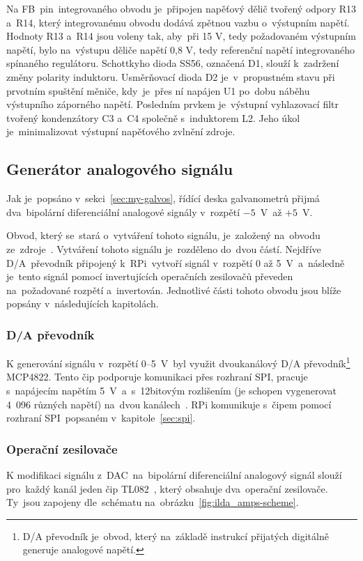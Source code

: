Na FB~pin~integrovaného obvodu je~připojen napěťový dělič tvořený odpory R13 a~R14, který integrovanému obvodu dodává zpětnou vazbu o~výstupním napětí.
Hodnoty R13 a~R14 jsou voleny tak, aby~při 15 V, tedy požadovaném výstupním napětí, bylo na~výstupu děliče napětí 0,8 V, tedy referenční napětí integrovaného spínaného regulátoru.
Schottkyho dioda SS56, označená D1, slouží k~zadržení změny polarity induktoru. Usměrňovací dioda D2 je~v~propustném stavu při prvotním spuštění měniče, kdy~je~přes ní napájen U1 po~dobu náběhu výstupního záporného napětí.
Posledním prvkem je~výstupní vyhlazovací filtr tvořený kondenzátory C3 a~C4 společně s~induktorem L2.
Jeho úkol je~minimalizovat výstupní napěťového zvlnění zdroje.~\cite{ampalyzer}

\subsection{Generátor analogového signálu}\label{sec:ilda-signal-gen}
Jak je~popsáno v~sekci~\ref{sec:my-galvos}, řídící deska galvanometrů přijmá dva~bipolární diferenciální analogové signály v~rozpětí $-5$~V~až $+5$~V.

Obvod, který se~stará o~vytváření tohoto signálu, je~založený na~obvodu ze~zdroje~\cite{lasershow-with-real-galvos}.
Vytváření tohoto signálu je~rozděleno do~dvou částí. Nejdříve D/A~převodník připojený k~RPi~vytvoří signál v~rozpětí 0 až 5~V~a~následně je~tento signál pomocí invertujících operačních zesilovačů převeden na~požadované rozpětí a~invertován.
Jednotlivé části tohoto obvodu jsou blíže popsány v~následujících kapitolách.

\subsubsection{D/A převodník}
K generování signálu v~rozpětí 0--5~V~byl využit dvoukanálový D/A převodník\footnote{D/A převodník je~obvod, který na~základě instrukcí přijatých digitálně generuje analogové napětí.} MCP4822.
Tento čip podporuje komunikaci přes rozhraní SPI, pracuje s~napájecím napětím 5~V~a~s~12bitovým rozlišením (je schopen vygenerovat 4~096 různých napětí) na~dvou kanálech~\cite{mcp4822-dsh}.
RPi komunikuje s~čipem pomocí rozhraní SPI~popsaném v~kapitole~\ref{sec:spi}.

\subsubsection{Operační zesilovače}
K modifikaci signálu z~DAC~na~bipolární diferenciální analogový signál slouží pro~každý kanál jeden čip TL082~\cite{tl082-dsh}, který obsahuje dva~operační zesilovače. Ty~jsou zapojeny dle~schématu na~obrázku~\ref{fig:ilda_amps-scheme}.

